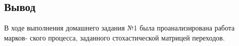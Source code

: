 \subsection{Вывод}
В ходе выполнения домашнего задания №1 была проанализирована работа марков- ского процесса, заданного стохастической матрицей переходов.

